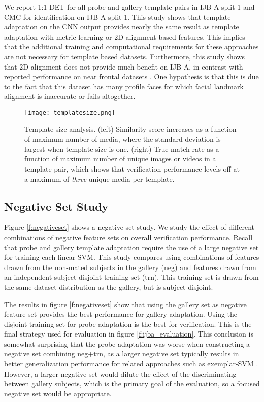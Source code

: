 \documentclass[10pt,twocolumn,letterpaper]{article}
\theoremstyle{definition}		\newtheorem{defn}[thm]{Definition}
\newcommand{\figwidth}{6.85in}
\newcommand{\ARXIV}{}
\begin{document}
We report 1:1 DET for all probe and gallery  template pairs in IJB-A split 1 and CMC for identification on IJB-A split 1.  This study shows that template adaptation on the CNN output provides nearly the same result as template adaptation with metric learning or 2D alignment based features.  This implies that the additional training and computational requirements for these approaches are not necessary for template based datasets.  Furthermore, this study shows that 2D alignment does not provide much benefit on IJB-A, in contrast with reported performance on near frontal datasets \cite{Parkhi15,Taigman14}.  One hypothesis is that this is due to the fact that this dataset has many profile faces for which facial landmark alignment is inaccurate or fails altogether.     





\ifdefined\ARXIV
\begin{figure*}[t]
\begin{centering}
\texttt{[image: templatesize.png]} 
\caption{Template size analysis. (left) Similarity score increases as a function of maximum number of media, where the standard deviation is largest when template size is one. (right) True match rate as a function of maximum number of unique images or videos in a template pair, which shows that verification performance levels off at a maximum of {\em three} unique media per template.}
\label{f:template}
\end{centering}
\end{figure*}

 \fi


\subsection{Negative Set Study}
\label{ss:negativeset}

Figure \ref{f:negativeset} shows a negative set study.  We study the effect of different combinations of negative feature sets on overall verification performance.  Recall that probe and gallery template adaptation require the use of a large negative set for training each linear SVM.  This study compares using combinations of features drawn from the non-mated subjects in the gallery (neg) and features drawn from an independent subject disjoint training set (trn). This training set is drawn from the same dataset distribution as the gallery, but is subject disjoint.  

The results in figure \ref{f:negativeset} show that using the gallery set as negative feature set provides the best performance for gallery adaptation.  Using the disjoint training set for probe adaptation is the best for verification.  This is the final strategy used for evaluation in figure \ref{f:ijba_evaluation}.  This conclusion is somewhat surprising that the probe adaptation was worse when constructing a negative set combining neg+trn, as a larger negative set typically results in better generalization performance for related approaches such as  exemplar-SVM \cite{Malisiewicz11}.  However, a larger negative set would dilute the effect of the discriminating between gallery subjects, which is the primary goal of the evaluation, so a focused negative set would be appropriate.
\end{document}
